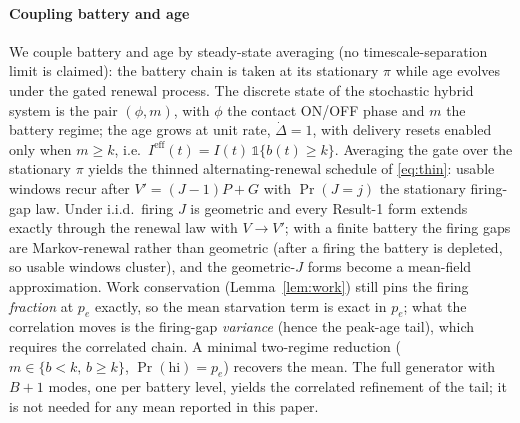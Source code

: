 \documentclass[twocolumn,3p,times,procedia]{elsarticle}
\theoremstyle{plain}
\theoremstyle{remark}
\newcommand{\AoI}{\Delta}
\newcommand{\Prob}{\Pr}
\newcommand{\ind}{\mathbb{1}}
\newcommand{\peff}{p_e}
\begin{document}
\paragraph*{Coupling battery and age}
We couple battery and age by steady-state averaging (no
timescale-separation limit is claimed): the battery chain is taken at
its stationary $\pi$ while age evolves under the gated renewal
process. The discrete state of the stochastic hybrid system is the pair
$(\phi,m)$, with $\phi$ the contact ON/OFF phase and $m$ the
battery regime; the age grows at unit rate, $\dot\AoI=1$, with delivery resets enabled only
when $m\ge k$, i.e.\ $I^{\mathrm{eff}}(t)=I(t)\,\ind\{b(t)\ge k\}$.
Averaging the gate over the stationary $\pi$ yields the thinned
alternating-renewal schedule of \eqref{eq:thin}: usable windows recur
after $V'=(J{-}1)P+G$ with $\Pr(J{=}j)$ the stationary firing-gap law.
Under i.i.d.\ firing $J$ is geometric and every Result-1 form extends
exactly through the renewal law with $V\to V'$; with a finite battery
the firing gaps are Markov-renewal rather than geometric (after a
firing the battery is depleted, so usable windows cluster), and the
geometric-$J$ forms become a mean-field approximation. Work conservation
(Lemma~\ref{lem:work}) still pins the firing \emph{fraction} at $\peff$
exactly, so the mean starvation term is exact in $\peff$; what the
correlation moves is the firing-gap \emph{variance} (hence the peak-age
tail), which requires the correlated chain. A minimal two-regime
reduction ($m\in\{b<k,\,b\ge k\}$, $\Prob(\text{hi})=\peff$) recovers the
mean. The full generator with $B{+}1$ modes, one per battery level,
yields the correlated refinement of the tail; it is not needed for any
mean reported in this paper.

\end{document}
